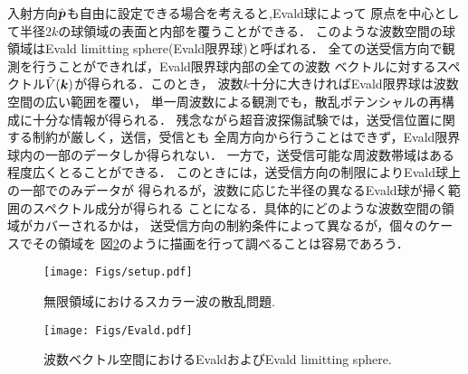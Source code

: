 入射方向$\hat{\mbox{\boldmath $p$}}$も自由に設定できる場合を考えると,Evald球によって
原点を中心として半径$2k$の球領域の表面と内部を覆うことができる．
このような波数空間の球領域はEvald limitting sphere(Evald限界球)と呼ばれる．
全ての送受信方向で観測を行うことができれば，Evald限界球内部の全ての波数
ベクトルに対するスペクトル$\tilde V(\mbox{\boldmath $k$})$が得られる．このとき，
波数$k$十分に大きければEvald限界球は波数空間の広い範囲を覆い，
単一周波数による観測でも，散乱ポテンシャルの再構成に十分な情報が得られる．
残念ながら超音波探傷試験では，送受信位置に関する制約が厳しく，送信，受信とも
全周方向から行うことはできず，Evald限界球内の一部のデータしか得られない．
一方で，送受信可能な周波数帯域はある程度広くとることができる．
このときには，送受信方向の制限によりEvald球上の一部でのみデータが
得られるが，波数に応じた半径の異なるEvald球が掃く範囲のスペクトル成分が得られる
ことになる．具体的にどのような波数空間の領域がカバーされるかは，
送受信方向の制約条件によって異なるが，個々のケースでその領域を
図\ref{fig:ZZZ_Evald}のように描画を行って調べることは容易であろう．
\begin{figure}[h]
	\begin{center}
	\texttt{[image: Figs/setup.pdf]} 
	\end{center}
	\caption{無限領域におけるスカラー波の散乱問題.} 
	\label{fig:ZZZ_100}
\end{figure}
\begin{figure}[h]
	\begin{center}
	\texttt{[image: Figs/Evald.pdf]} 
	\end{center}
	\caption{波数ベクトル空間におけるEvaldおよびEvald limitting sphere.} 
	\label{fig:ZZZ_Evald}
\end{figure}
